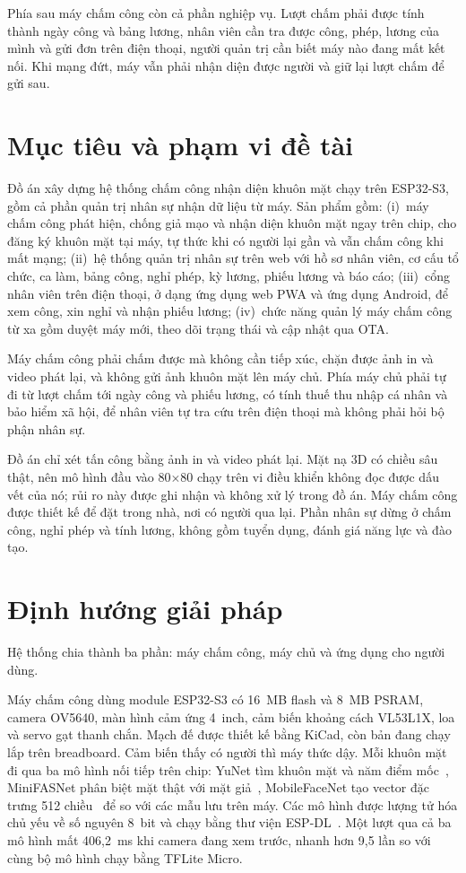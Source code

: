 \documentclass[../DoAn.tex]{subfiles}
\begin{document}
Phía sau máy chấm công còn cả phần nghiệp vụ. Lượt chấm phải được tính thành
ngày công và bảng lương, nhân viên cần tra được công, phép, lương của mình và
gửi đơn trên điện thoại, người quản trị cần biết máy nào đang mất kết nối. Khi
mạng đứt, máy vẫn phải nhận diện được người và giữ lại lượt chấm để gửi sau.

\section{Mục tiêu và phạm vi đề tài}
\label{section:1.2}

Đồ án xây dựng hệ thống chấm công nhận diện khuôn mặt chạy trên ESP32-S3,
gồm cả phần quản trị nhân sự nhận dữ liệu từ máy. Sản phẩm gồm:
(i)~máy chấm công phát hiện, chống giả mạo và nhận diện khuôn mặt ngay trên
chip, cho đăng ký khuôn mặt tại máy, tự thức khi có người lại gần và vẫn chấm
công khi mất mạng; (ii)~hệ thống quản trị nhân sự trên web với hồ sơ nhân
viên, cơ cấu tổ chức, ca làm, bảng công, nghỉ phép, kỳ lương, phiếu lương và
báo cáo; (iii)~cổng nhân viên trên điện thoại, ở dạng ứng dụng web PWA và ứng
dụng Android, để xem công, xin nghỉ và nhận phiếu lương; (iv)~chức năng quản
lý máy chấm công từ xa gồm duyệt máy mới, theo dõi trạng thái và cập nhật
qua OTA.

Máy chấm công phải chấm được mà không cần tiếp xúc, chặn được ảnh in và video
phát lại, và không gửi ảnh khuôn mặt lên máy chủ. Phía máy chủ phải tự đi từ
lượt chấm tới ngày công và phiếu lương, có tính thuế thu nhập cá nhân và bảo
hiểm xã hội, để nhân viên tự tra cứu trên điện thoại mà không phải hỏi bộ phận
nhân sự.

Đồ án chỉ xét tấn công bằng ảnh in và video phát lại. Mặt nạ 3D có chiều sâu
thật, nên mô hình đầu vào 80$\times$80 chạy trên vi điều khiển không đọc được
dấu vết của nó; rủi ro này được ghi nhận và không xử lý trong đồ án. Máy chấm
công được thiết kế để đặt trong nhà, nơi có người qua lại. Phần nhân sự dừng
ở chấm công, nghỉ phép và tính lương, không gồm tuyển dụng, đánh giá năng lực
và đào tạo.

\section{Định hướng giải pháp}
\label{section:1.3}

Hệ thống chia thành ba phần: máy chấm công, máy chủ và ứng dụng cho người dùng.

Máy chấm công dùng module ESP32-S3 có 16~MB flash và 8~MB PSRAM, camera
OV5640, màn hình cảm ứng 4~inch, cảm biến khoảng cách VL53L1X, loa và servo gạt
thanh chắn. Mạch đế được thiết kế bằng KiCad, còn bản đang chạy lắp trên breadboard.
Cảm biến thấy có người
thì máy thức dậy. Mỗi khuôn mặt đi qua ba mô hình nối tiếp trên chip: YuNet tìm
khuôn mặt và năm điểm mốc~\cite{yunet2023}, MiniFASNet phân biệt mặt thật với
mặt giả~\cite{minifas}, MobileFaceNet tạo vector đặc trưng 512
chiều~\cite{mobilefacenet2018} để so với các mẫu lưu trên máy. Các mô hình được
lượng tử hóa chủ yếu về số nguyên 8~bit và chạy bằng thư viện
ESP-DL~\cite{espdl}. Một lượt qua cả ba mô hình mất 406,2~ms khi
camera đang xem trước, nhanh hơn 9,5 lần so với cùng bộ mô hình chạy bằng
TFLite Micro.
\end{document}
